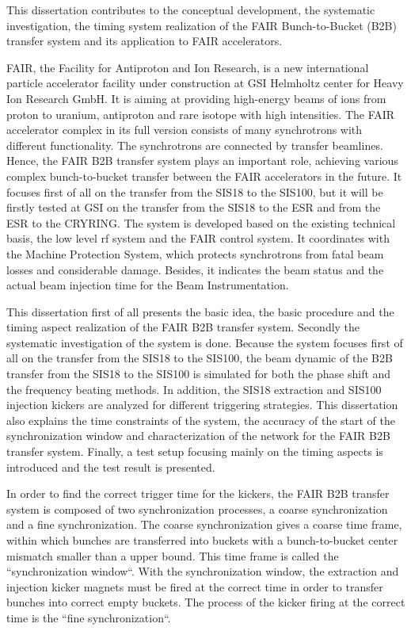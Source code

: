 This dissertation contributes to the conceptual development, the systematic investigation, the timing system realization of the FAIR Bunch-to-Bucket (B2B) transfer system and its application to FAIR accelerators. 

FAIR, the Facility for Antiproton and Ion Research, is a new international particle accelerator facility under construction at GSI Helmholtz center for Heavy Ion Research GmbH. It is aiming at providing high-energy beams of ions from proton to uranium, antiproton and rare isotope with high intensities. The FAIR accelerator complex in its full version consists of many synchrotrons with different functionality. The synchrotrons are connected by transfer beamlines. Hence, the FAIR B2B transfer system plays an important role, achieving various complex bunch-to-bucket transfer between the FAIR accelerators in the future. It focuses first of all on the transfer from the SIS18 to the SIS100, but it will be firstly tested at GSI on the transfer from the SIS18 to the ESR and from the ESR to the CRYRING. The system is developed based on the existing technical basis, the low level rf system and the FAIR control system. It coordinates with the Machine Protection System, which protects synchrotrons from fatal beam losses and considerable damage. Besides, it indicates the beam status and the actual beam injection time for the Beam Instrumentation. 
 
This dissertation first of all presents the basic idea, the basic procedure and the timing aspect realization of the FAIR B2B transfer system. Secondly the systematic investigation of the system is done. Because the system focuses first of all on the transfer from the SIS18 to the SIS100, the beam dynamic of the B2B transfer from the SIS18 to the SIS100 is simulated for both the phase shift and the frequency beating methods. In addition, the SIS18 extraction and SIS100 injection kickers are analyzed for different triggering strategies. This dissertation also explains the time constraints of the system, the accuracy of the start of the synchronization window and characterization of the network for the FAIR B2B transfer system. Finally, a test setup focusing mainly on the timing aspects is introduced and the test result is presented. 

In order to find the correct trigger time for the kickers, the FAIR B2B transfer system is composed of two synchronization processes, a coarse synchronization and a fine synchronization. The coarse synchronization gives a coarse time frame, within which bunches are transferred into buckets with a bunch-to-bucket center mismatch smaller than a upper bound. This time frame is called the ``synchronization window``. With the synchronization window, the extraction
and injection kicker magnets must be fired at the correct time in order to transfer bunches into correct empty buckets. The process of the kicker firing at the correct time is the ``fine synchronization``. 

